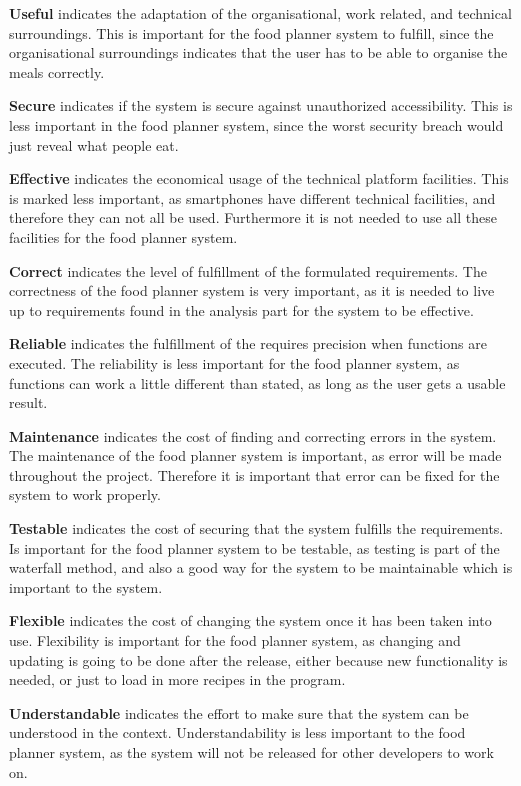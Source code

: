 \textbf{Useful} indicates the adaptation of the organisational, work related, and technical surroundings. This is important for the food planner system to fulfill, since the organisational surroundings indicates that the user has to be able to organise the meals correctly.

\textbf{Secure} indicates if the system is secure against unauthorized accessibility. This is less important in the food planner system, since the worst security breach would just reveal what people eat.

\textbf{Effective} indicates the economical usage of the technical platform facilities. This is marked less important, as smartphones have different technical facilities, and therefore they can not all be used. Furthermore it is not needed to use all these facilities for the food planner system.

\textbf{Correct} indicates the level of fulfillment of the formulated requirements. The correctness of the food planner system is very important, as it is needed to live up to requirements found in the analysis part for the system to be effective.

\textbf{Reliable} indicates the fulfillment of the requires precision when functions are executed. The reliability is less important for the food planner system, as functions can work a little different than stated, as long as the user gets a usable result.

\textbf{Maintenance} indicates the cost of finding and correcting errors in the system. The maintenance of the food planner system is important, as error will be made throughout the project. Therefore it is important that error can be fixed for the system to work properly.

\textbf{Testable} indicates the cost of securing that the system fulfills the requirements. Is important for the food planner system to be testable, as testing is part of the waterfall method, and also a good way for the system to be maintainable which is important to the system.

\textbf{Flexible} indicates the cost of changing the system once it has been taken into use. Flexibility is important for the food planner system, as changing and updating is going to be done after the release, either because new functionality is needed, or just to load in more recipes in the program.

\textbf{Understandable} indicates the effort to make sure that the system can be understood in the context. Understandability is less important to the food planner system, as the system will not be released for other developers to work on.

